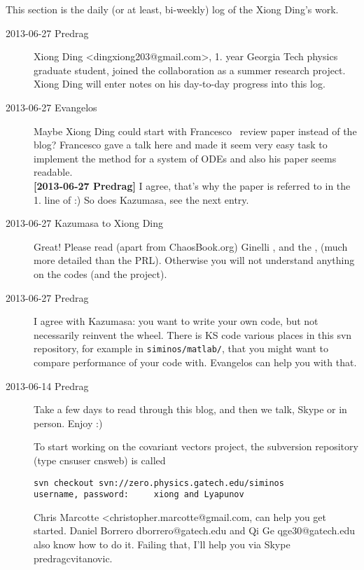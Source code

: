 This section is the daily (or at least, bi-weekly)  log of the Xiong Ding's
work.

\begin{description}

\item[2013-06-27 Predrag] Xiong Ding  <dingxiong203@gmail.com>,
1. year Georgia Tech physics graduate student, joined the
collaboration as a summer research project.
Xiong Ding will enter notes on his day-to-day progress into this log.

\item[2013-06-27 Evangelos] Maybe Xiong Ding could start with Francesco
    \etal\ review paper instead of the blog? Francesco
    gave a talk here and made it seem very easy task to implement the
    method for a system of ODEs and also his paper seems readable.
    \\
{\bf [2013-06-27 Predrag]}
I agree, that's why the paper is referred to in the 1. line of
 :) So does Kazumasa, see the next entry.

\item[2013-06-27 Kazumasa  to Xiong Ding]
Great! Please read (apart from ChaosBook.org)
Ginelli \etal{}
, and the
,
(much more detailed than the PRL).
Otherwise you will not understand anything on the codes (and the project).

\item[2013-06-27 Predrag]
I agree with Kazumasa: you want to write your own code,
but not necessarily reinvent the wheel. There is KS code various
places in this svn repository, for example in
\texttt{siminos/matlab/}, that you might want to compare performance
of your code with. Evangelos can help you with that.


\item[2013-06-14 Predrag]
Take a few days to read through this blog, and then we talk,
Skype or in person.
Enjoy :)

To start working on the covariant vectors project,
the
 {subversion repository}
(type   cnsuser   cnsweb) is called
\begin{verbatim}
svn checkout svn://zero.physics.gatech.edu/siminos
username, password:     xiong and Lyapunov
\end{verbatim}
Chris Marcotte <christopher.marcotte@gmail.com, can help you get
started. Daniel Borrero dborrero@gatech.edu and Qi Ge
    qge30@gatech.edu also know how to do it. Failing that, I'll help
you via Skype predragcvitanovic.


\end{description}
